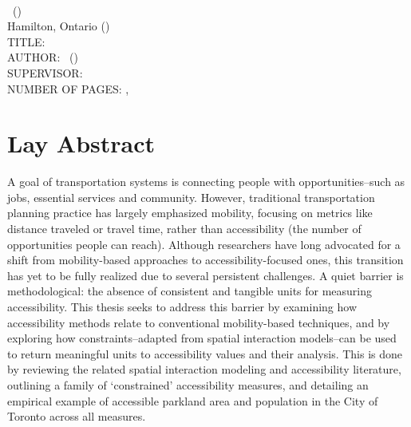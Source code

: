 \documentclass[
11pt, %
oneside, %
english, %
singlespacing, %
]{macthesis} %
\def\blankpage{%
      \clearpage%
      \thispagestyle{empty}%
      \addtocounter{page}{-1}%
      \null%
      \clearpage}
\begin{document}


\blankpage
\clearpage


\newpage
{} %
\setcounter{page}{2} %

\noindent %
\univname \\
\degreename\, (\the\year) \\
Hamilton, Ontario (\deptname) \\[1.5cm]
TITLE: \ttitle \\
AUTHOR: \authorname\,  %
(\univname)  \\
SUPERVISOR: \supname\, \\
NUMBER OF PAGES: \pageref{lastoffront}, \pageref{LastPage}  %

\clearpage

\section*{Lay Abstract}
  A goal of transportation systems is connecting people with opportunities--such as jobs, essential services and community. However, traditional transportation planning practice has largely emphasized mobility, focusing on metrics like distance traveled or travel time, rather than accessibility (the number of opportunities people can reach). Although researchers have long advocated for a shift from mobility-based approaches to accessibility-focused ones, this transition has yet to be fully realized due to several persistent challenges. A quiet barrier is methodological: the absence of consistent and tangible units for measuring accessibility. This thesis seeks to address this barrier by examining how accessibility methods relate to conventional mobility-based techniques, and by exploring how constraints--adapted from spatial interaction models--can be used to return meaningful units to accessibility values and their analysis. This is done by reviewing the related spatial interaction modeling and accessibility literature, outlining a family of `constrained' accessibility measures, and detailing an empirical example of accessible parkland area and population in the City of Toronto across all measures.
\blankpage
\clearpage
\end{document}
